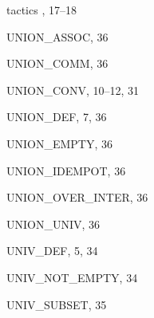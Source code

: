 \begin{theindex}
  \indexspace

  \item tactics
    , 17--18

  \indexspace

  \item {\ptt UNION\_ASSOC}, 36
  \item {\ptt UNION\_COMM}, 36
  \item {\ptt UNION\_CONV}, 10--12, 31
  \item {\ptt UNION\_DEF}, 7, 36
  \item {\ptt UNION\_EMPTY}, 36
  \item {\ptt UNION\_IDEMPOT}, 36
  \item {\ptt UNION\_OVER\_INTER}, 36
  \item {\ptt UNION\_UNIV}, 36
  \item {\ptt UNIV\_DEF}, 5, 34
  \item {\ptt UNIV\_NOT\_EMPTY}, 34
  \item {\ptt UNIV\_SUBSET}, 35

\end{theindex}
